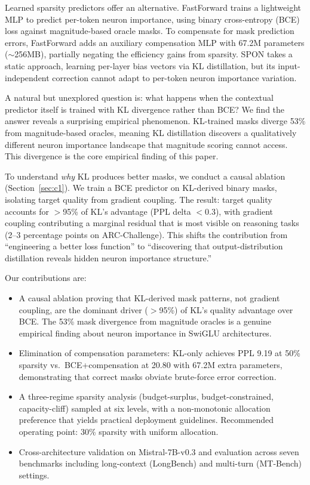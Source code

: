 \documentclass[11pt,a4paper]{article}
\begin{document}
Learned sparsity predictors offer an alternative. FastForward \citep{wang2024fastforward} trains a lightweight MLP to predict per-token neuron importance, using binary cross-entropy (BCE) loss against magnitude-based oracle masks. To compensate for mask prediction errors, FastForward adds an auxiliary compensation MLP with 67.2M parameters (${\sim}$256MB), partially negating the efficiency gains from sparsity. SPON \citep{huang2024spon} takes a static approach, learning per-layer bias vectors via KL distillation, but its input-independent correction cannot adapt to per-token neuron importance variation.

A natural but unexplored question is: what happens when the contextual predictor itself is trained with KL divergence rather than BCE? We find the answer reveals a surprising empirical phenomenon. KL-trained masks diverge 53\% from magnitude-based oracles, meaning KL distillation discovers a qualitatively different neuron importance landscape that magnitude scoring cannot access. This divergence is the core empirical finding of this paper.

To understand \emph{why} KL produces better masks, we conduct a causal ablation (Section~\ref{sec:c1}). We train a BCE predictor on KL-derived binary masks, isolating target quality from gradient coupling. The result: target quality accounts for $>$95\% of KL's advantage (PPL delta $<$0.3), with gradient coupling contributing a marginal residual that is most visible on reasoning tasks (2--3 percentage points on ARC-Challenge). This shifts the contribution from ``engineering a better loss function'' to ``discovering that output-distribution distillation reveals hidden neuron importance structure.''

Our contributions are:
\begin{itemize}
\item A causal ablation proving that KL-derived mask patterns, not gradient coupling, are the dominant driver ($>$95\%) of KL's quality advantage over BCE. The 53\% mask divergence from magnitude oracles is a genuine empirical finding about neuron importance in SwiGLU architectures.
\item Elimination of compensation parameters: KL-only achieves PPL 9.19 at 50\% sparsity vs.\ BCE+compensation at 20.80 with 67.2M extra parameters, demonstrating that correct masks obviate brute-force error correction.
\item A three-regime sparsity analysis (budget-surplus, budget-constrained, capacity-cliff) sampled at six levels, with a non-monotonic allocation preference that yields practical deployment guidelines. Recommended operating point: 30\% sparsity with uniform allocation.
\item Cross-architecture validation on Mistral-7B-v0.3 and evaluation across seven benchmarks including long-context (LongBench) and multi-turn (MT-Bench) settings.
\end{itemize}
\end{document}
